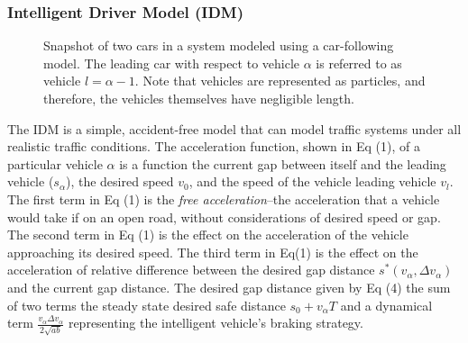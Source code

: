 \documentclass[12pt]{article}
\begin{document}
\subsubsection{Intelligent Driver Model (IDM)}
\begin{figure}
  \centering
  \caption{Snapshot of two cars in a system modeled using a car-following model.  The leading car with respect to vehicle $\alpha$  is referred to as vehicle $l=\alpha-1$.  Note that vehicles are represented as particles, and therefore, the vehicles themselves have negligible length.}
\end{figure}
The IDM is a simple, accident-free model that can model traffic systems under all realistic traffic conditions.  The acceleration function, shown in Eq (1), of a particular vehicle $\alpha$ is a function the current gap between itself and the leading vehicle ($s_\alpha$), the desired speed $v_0$, and the speed of the vehicle leading vehicle $v_l$.  The first term in Eq (1) is the \textit{free acceleration}\---the acceleration that a vehicle would take if on an open road, without considerations of desired speed or gap.  The second term in Eq (1) is the effect on the acceleration of the vehicle approaching its desired speed.  The third term in Eq(1) is the effect on the acceleration of relative difference between the desired gap distance $s^*(v_\alpha,\Delta v_\alpha)$ and the current gap distance.  The desired gap distance given by Eq (4) the sum of two terms the steady state desired safe distance $s_0+v_\alpha T$ and a dynamical term $\frac{v_\alpha \Delta v_\alpha}{2 \sqrt{ab}}$ representing the intelligent vehicle's braking strategy.
\end{document}
